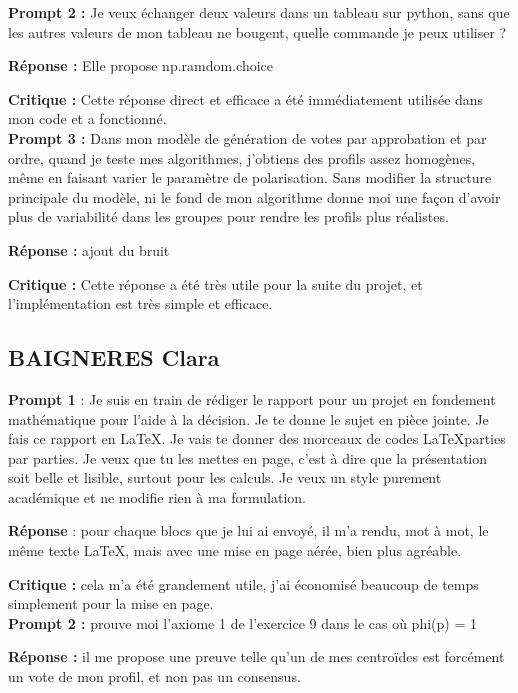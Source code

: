 \documentclass[11pt]{article}
\begin{document}
\textbf{Prompt 2 :} Je veux échanger deux valeurs dans un tableau sur python, sans que les autres valeurs de mon tableau ne bougent, quelle commande je peux utiliser ?

\textbf{Réponse :}  Elle propose np.ramdom.choice

\textbf{Critique :} Cette réponse direct et efficace a été immédiatement utilisée dans mon code et a fonctionné.
\\

\textbf{Prompt 3 :} Dans mon modèle de génération de votes par approbation et par ordre, quand je teste mes algorithmes, j’obtiens des profils assez homogènes, même en faisant varier le paramètre de polarisation. Sans modifier la structure principale du modèle, ni le fond de mon algorithme donne moi une façon d’avoir plus de variabilité dans les groupes pour rendre les profils plus réalistes. 

\textbf{Réponse :} ajout du bruit 

\textbf{Critique :} Cette réponse a été très utile pour la suite du projet, et l’implémentation est très simple et efficace. 

\subsection{BAIGNERES Clara}

\textbf{Prompt 1} : Je suis en train de rédiger le rapport pour un projet en fondement mathématique pour l'aide à la décision. Je te donne le sujet en pièce jointe. Je fais ce rapport en \LaTeX. Je vais te donner des morceaux de codes \LaTeX parties par parties. Je veux que tu les mettes en page, c'est à dire que la présentation soit belle et lisible, surtout pour les calculs. Je veux un style purement académique et ne modifie rien à ma formulation.

\textbf{Réponse} : pour chaque blocs que je lui ai envoyé, il m'a rendu, mot à mot, le même texte \LaTeX, mais avec une mise en page aérée, bien plus agréable. 

\textbf{Critique :} cela m'a été grandement utile, j'ai économisé beaucoup de temps simplement pour la mise en page.
\\

\textbf{Prompt 2 :} prouve moi l'axiome 1 de l'exercice 9 dans le cas où phi(p) = 1 

\textbf{Réponse :} il me propose une preuve telle qu'un de mes centroïdes est forcément un vote de mon profil, et non pas un consensus. 
\end{document}
